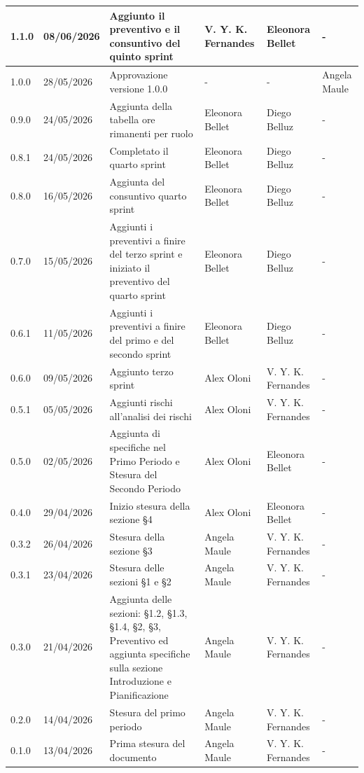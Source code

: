 \documentclass[a4paper,12pt]{article}
\begin{document}
\begin{longtable}{|l|l|p{4.5cm}|p{2cm}|p{2.5cm}|p{2.5cm}|}
    1.1.0 & 08/06/2026 & Aggiunto il preventivo e il consuntivo del quinto sprint & V. Y. K. Fernandes & Eleonora Bellet & - \\ \hline
    1.0.0 & 28/05/2026 & Approvazione versione 1.0.0 & - & - & Angela Maule \\ \hline
    0.9.0 & 24/05/2026 & Aggiunta della tabella ore rimanenti per ruolo & Eleonora Bellet & Diego Belluz & - \\ \hline
    0.8.1 & 24/05/2026 & Completato il quarto sprint & Eleonora Bellet & Diego Belluz & - \\ \hline
    0.8.0 & 16/05/2026 & Aggiunta del consuntivo quarto sprint & Eleonora Bellet & Diego Belluz & - \\ \hline
    0.7.0 & 15/05/2026 & Aggiunti i preventivi a finire del terzo sprint e iniziato il preventivo del quarto sprint & Eleonora Bellet & Diego Belluz & - \\ \hline
    0.6.1 & 11/05/2026 & Aggiunti i preventivi a finire del primo e del secondo sprint & Eleonora Bellet & Diego Belluz & - \\ \hline
    0.6.0 & 09/05/2026 & Aggiunto terzo sprint & Alex Oloni & V. Y. K. Fernandes & - \\ \hline
    0.5.1 & 05/05/2026 & Aggiunti rischi all'analisi dei rischi & Alex Oloni & V. Y. K. Fernandes & - \\ \hline
    0.5.0 & 02/05/2026 & Aggiunta di specifiche nel Primo Periodo e Stesura del Secondo Periodo & Alex Oloni & Eleonora Bellet & - \\ \hline
    0.4.0 & 29/04/2026 & Inizio stesura della sezione §4 & Alex Oloni & Eleonora Bellet & - \\ \hline
    0.3.2 & 26/04/2026 & Stesura della sezione §3 & Angela Maule & V. Y. K. Fernandes & - \\ \hline
    0.3.1 & 23/04/2026 & Stesura delle sezioni §1 e §2 & Angela Maule & V. Y. K. Fernandes & - \\ \hline
    0.3.0 & 21/04/2026 & Aggiunta delle sezioni: §1.2, §1.3, §1.4, §2, §3, Preventivo ed aggiunta specifiche sulla sezione Introduzione e Pianificazione & Angela Maule & V. Y. K. Fernandes & - \\ \hline
    0.2.0 & 14/04/2026 & Stesura del primo periodo & Angela Maule & V. Y. K. Fernandes & - \\ \hline
    0.1.0 & 13/04/2026 & Prima stesura del documento & Angela Maule & V. Y. K. Fernandes & - \\ \hline

\end{longtable}
\end{document}
